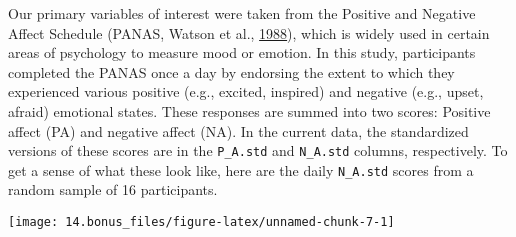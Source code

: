 \documentclass[]{article}
\newenvironment{Shaded}{\begin{snugshade}}{\end{snugshade}}
\newcommand{\DataTypeTok}[1]{\textcolor[rgb]{0.13,0.29,0.53}{#1}}
\newcommand{\DecValTok}[1]{\textcolor[rgb]{0.00,0.00,0.81}{#1}}
\newcommand{\KeywordTok}[1]{\textcolor[rgb]{0.13,0.29,0.53}{\textbf{#1}}}
\newcommand{\NormalTok}[1]{#1}
\newcommand{\OperatorTok}[1]{\textcolor[rgb]{0.81,0.36,0.00}{\textbf{#1}}}
\newcommand{\StringTok}[1]{\textcolor[rgb]{0.31,0.60,0.02}{#1}}
\begin{document}
Our primary variables of interest were taken from the Positive and
Negative Affect Schedule (PANAS, Watson et al.,
\protect\hyperlink{ref-watsonPANASDevelopment1988}{1988}), which is
widely used in certain areas of psychology to measure mood or emotion.
In this study, participants completed the PANAS once a day by endorsing
the extent to which they experienced various positive (e.g., excited,
inspired) and negative (e.g., upset, afraid) emotional states. These
responses are summed into two scores: Positive affect (PA) and negative
affect (NA). In the current data, the standardized versions of these
scores are in the \texttt{P\_A.std} and \texttt{N\_A.std} columns,
respectively. To get a sense of what these look like, here are the daily
\texttt{N\_A.std} scores from a random sample of 16 participants.

\begin{Shaded}
\end{Shaded}

\begin{center}\texttt{[image: 14.bonus\_files/figure-latex/unnamed-chunk-7-1]} \end{center}
\end{document}

